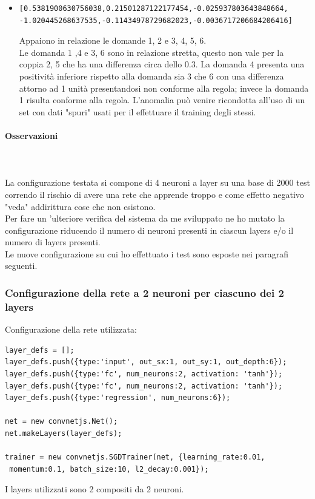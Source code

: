 \begin{itemize}
\item  \begin{verbatim}[0.5381900630756038,0.21501287122177454,-0.025937803643848664,
-1.020445268637535,-0.11434978729682023,-0.0036717206684206416]
\end{verbatim}
Appaiono in relazione le domande 1, 2 e 3, 4, 5, 6.\\
Le domanda 1 ,4 e 3, 6  sono in relazione stretta, questo non vale per la coppia 2, 5 che ha una differenza circa dello 0.3. La domanda 4 presenta una positivit\`a inferiore rispetto alla domanda sia 3 che 6 con una differenza attorno ad 1 unit\`a presentandosi non conforme alla regola; invece la domanda 1 risulta conforme alla regola. L'anomalia pu\`o venire ricondotta all'uso di un set con dati "spuri" usati per il effettuare il training degli stessi.
\end{itemize}

\paragraph{Osservazioni}\mbox{}
\label{Osservazioni su rete a 4 neuroni per ciascuno dei 2 layers}
\\\\
\noindent
La configurazione testata si compone di 4 neuroni a layer su una base di 2000 test correndo il rischio di avere una rete che apprende troppo e come effetto negativo "veda" addirittura cose che non esistono.\\
Per fare un 'ulteriore verifica del sistema da me sviluppato ne ho mutato la configurazione riducendo il numero di neuroni presenti in ciascun layers e/o il numero di layers presenti.\\
Le nuove configurazione su cui ho effettuato i test sono esposte nei paragrafi seguenti.

\subsubsection{Configurazione della rete a 2 neuroni per ciascuno dei 2 layers}
\label{Configurazione della rete a 2 neuroni per ciascuno dei 2 layers}
Configurazione della rete utilizzata:\\
\begin{verbatim}layer_defs = [];
layer_defs.push({type:'input', out_sx:1, out_sy:1, out_depth:6});
layer_defs.push({type:'fc', num_neurons:2, activation: 'tanh'});
layer_defs.push({type:'fc', num_neurons:2, activation: 'tanh'});
layer_defs.push({type:'regression', num_neurons:6});

net = new convnetjs.Net();
net.makeLayers(layer_defs);

trainer = new convnetjs.SGDTrainer(net, {learning_rate:0.01,
 momentum:0.1, batch_size:10, l2_decay:0.001});
\end{verbatim}
\noindent
I layers utilizzati sono 2 compositi da 2 neuroni.

